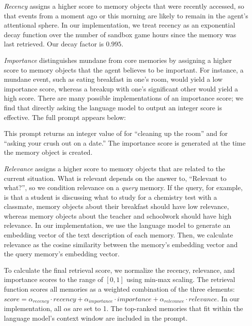 \textit{Recency} assigns a higher score to memory objects that were recently accessed, so that events from a moment ago or this morning are likely to remain in the agent's attentional sphere. In our implementation, we treat recency as an exponential decay function over the number of sandbox game hours since the memory was last retrieved. Our decay factor is $0.995$. 

\textit{Importance} distinguishes mundane from core memories by assigning a higher score to memory objects that the agent believes to be important. For instance, a mundane event, such as eating breakfast in one's room, would yield a low importance score, whereas a breakup with one's significant other would yield a high score. There are many possible implementations of an importance score; we find that directly asking the language model to output an integer score is effective. The full prompt appears below:

\begin{quote}

    \end{quote}

This prompt returns an integer value of {\color{darkgray}\small\fontfamily{}} for “cleaning up the room” and {\color{darkgray}\small\fontfamily{}} for “asking your crush out on a date.” The importance score is generated at the time the memory object is created.

\textit{Relevance} assigns a higher score to memory objects that are related to the current situation. What is relevant depends on the answer to, ``Relevant to what?'', so we condition relevance on a \textit{query} memory. If the query, for example, is that a student is discussing what to study for a chemistry test with a classmate, memory objects about their breakfast should have low relevance, whereas memory objects about the teacher and schoolwork should have high relevance. In our implementation, we use the language model to generate an embedding vector of the text description of each memory. Then, we calculate relevance as the cosine similarity between the memory's embedding vector and the query memory's embedding vector.

To calculate the final retrieval score, we normalize the recency, relevance, and importance scores to the range of $[0, 1]$ using min-max scaling. The retrieval function scores all memories as a weighted combination of the three elements: $score=\alpha_{recency} \cdot recency + \alpha_{importance} \cdot importance + \alpha_{relevance} \cdot relevance$. In our implementation, all $\alpha$s are set to 1. The top-ranked memories that fit within the language model's context window are included in the prompt.


